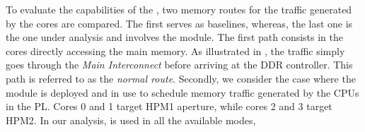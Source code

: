 
To evaluate the capabilities of the \schim, two memory routes for
the traffic generated by the cores are compared. The first serves
as baselines, whereas, the last one is the one under analysis and
involves the \schim module.  The first path consists in the cores
directly accessing the main memory. As illustrated in
, the traffic simply goes through the
\emph{Main Interconnect} before arriving at the DDR controller. This
path is referred to as the \emph{normal route}.
Secondly, we consider the case where the \schim module is deployed and in
use to schedule memory traffic generated by the CPUs in the PL. Cores
0 and 1 target HPM1 aperture, while cores 2 and 3 target HPM2. In our
analysis, \schim is used in all the available modes, 


